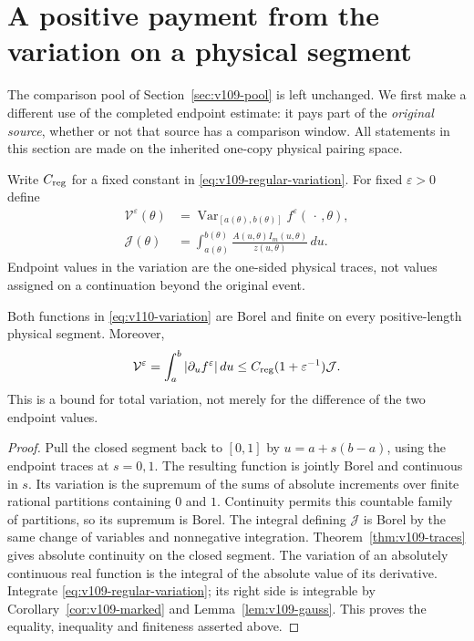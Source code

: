 \section{A positive payment from the variation on a physical segment}
\label{sec:v110-variation}
The comparison pool of Section~\ref{sec:v109-pool} is left unchanged.
We first make a different use of the completed endpoint estimate: it
pays part of the \emph{original source}, whether or not that source
has a comparison window. All statements in this section are made
on the inherited one-copy physical pairing space.

Write $C_{\rm reg}$ for a fixed constant in
\eqref{eq:v109-regular-variation}. For fixed $\varepsilon>0$ define
\begin{equation}\label{eq:v110-variation}
 \begin{split}
 \mathcal V^\varepsilon(\theta)
   &=\operatorname{Var}_{[a(\theta),b(\theta)]}
                         f^\varepsilon(\,\cdot\,,\theta),\\
 \mathcal J(\theta)&=\int_{a(\theta)}^{b(\theta)}
               \frac{A(u,\theta)I_m(u,\theta)}{z(u,\theta)}\,du.
 \end{split}
\end{equation}
Endpoint values in the variation are the one-sided physical traces,
not values assigned on a continuation beyond the original event.

\begin{lemma}
\label{lem:v110-variation}
Both functions in \eqref{eq:v110-variation} are Borel and finite on
every positive-length physical segment. Moreover,
\begin{equation}\label{eq:v110-full-variation}
 \mathcal V^\varepsilon
   =\int_a^b|\partial_u f^\varepsilon|\,du
   \le C_{\rm reg}(1+\varepsilon^{-1})\mathcal J.
\end{equation}
This is a bound for total variation, not merely for the difference
of the two endpoint values.
\end{lemma}
\begin{proof}
Pull the closed segment back to $[0,1]$ by $u=a+s(b-a)$, using the
endpoint traces at $s=0,1$. The resulting function is jointly Borel
and continuous in $s$. Its variation is the supremum of the sums of
absolute increments over finite rational partitions containing
$0$ and $1$. Continuity permits this countable family of partitions,
so its supremum is Borel. The integral defining $\mathcal J$ is
Borel by the same change of variables and nonnegative integration.
Theorem~\ref{thm:v109-traces} gives absolute continuity on the closed
segment. The variation of an absolutely continuous real function is
the integral of the absolute value of its derivative. Integrate
\eqref{eq:v109-regular-variation}; its right side is integrable by
Corollary~\ref{cor:v109-marked} and Lemma~\ref{lem:v109-gauss}.
This proves the equality, inequality and finiteness asserted above.
\end{proof}

